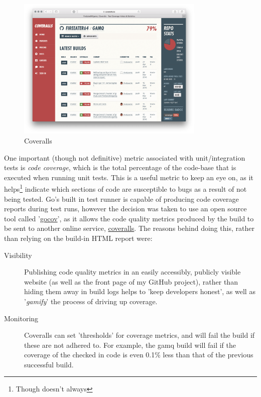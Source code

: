 \begin{figure}[H]
  \includegraphics[width=0.8\textwidth]{figures/coverallsScreenshot}
  \centering
  \caption{Coveralls}
  \label{fig:coveralls}
\end{figure}

One important (though not definitive) metric associated with unit/integration
tests is \emph{code coverage}, which is the total percentage of the code-base
that is executed when running unit tests. This is a useful metric to keep an eye
on, as it helps\footnote{Though doesn't always} indicate which sections of code
are susceptible to bugs as a result of not being tested. Go's built in test
runner is capable of producing code coverage reports during test runs, however
the decision was taken to use an open source tool called
'\href{https://github.com/axw/gocov}{gocov}', as it allows the code
quality metrics produced by the build to be sent to another online service,
\href{https://coveralls.io/}{coveralls}. The reasons behind doing this, rather
than relying on the build-in HTML report were:
\begin{description}
  \item[Visibility] Publishing code quality metrics in an easily accessibly,
  publicly visible website (as well as the front page of my GitHub project),
  rather than hiding them away in build logs helps to 'keep developers honest', as well
  as '\textit{\gls{gamify}}' the process of driving up coverage.
  \item[Monitoring] Coveralls can set 'thresholds' for coverage
  metrics, and will fail the build if these are not adhered to. For example, the \gls{gamq}
  build will fail if the coverage of the checked in code is even 0.1\% less than
  that of the previous successful build.
\end{description}

